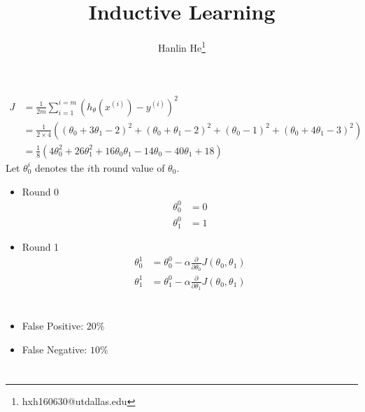 \documentclass[10pt]{article}
\title{Inductive Learning}
\author{Hanlin He\footnote{hxh160630@utdallas.edu}}
\theoremstyle{definition}
\begin{document}
\maketitle

\section{}
\begin{align}
    J &=\frac{1}{2m}\sum_{i=1}^{i=m}(h_\theta(x^{(i)})-y^{(i)})^2 \\
      &=\frac{1}{2\times{4}}\left((\theta_0+3\theta_1-2)^2+(\theta_0+\theta_1-2)^2+(\theta_0-1)^2+(\theta_0+4\theta_1-3)^2\right)\\
      &=\frac{1}{8}(4\theta_0^2+26\theta_1^2+16\theta_0\theta_1-14\theta_0-40\theta_1+18)
\end{align}
Let $\theta_0^i$ denotes the $i$th round value of $\theta_0$.
\begin{itemize}
    \item Round 0
        \begin{align}
            \theta_0^0 &= 0\\
            \theta_1^0 &= 1
        \end{align}
    \item Round 1
        \begin{align}
            \theta_0^1&=\theta_0^0-\alpha\frac{\partial}{\partial\theta_0}J(\theta_0,\theta_1)\\
            \theta_1^1&=\theta_1^0-\alpha\frac{\partial}{\partial\theta_1}J(\theta_0,\theta_1)
        \end{align}
\end{itemize}

\section{}
\begin{itemize}
    \item False Positive: $20\%$
    \item False Negative: $10\%$
\end{itemize}

\section{}

\section{}
\end{document}
